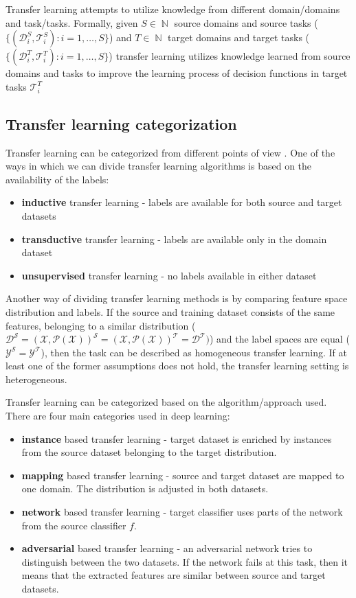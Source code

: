 \documentclass[a4paper,11pt,twoside]{report}
\theoremstyle{definition}
\DeclareMathOperator{\natur}{\mathbb{N}}
\begin{document}
Transfer learning attempts to utilize knowledge from different domain/domains and task/tasks. Formally, given $S \in \natur$ source domains and source tasks ($\{(\mathcal{D}_i^S,\mathcal{T}_i^S): i=1, \dots, S \}$) and $T \in \natur$ target domains and target tasks ($\{(\mathcal{D}_i^T,\mathcal{T}_i^T): i=1, \dots, S \}$) transfer learning utilizes knowledge learned from source domains and tasks to improve the learning process of decision functions in target tasks $\mathcal{T}_i^T$
\subsection{Transfer learning categorization}
Transfer learning can be categorized from different points of view \cite{comp_survey_transfer_leaerning}. One of the ways in which we can divide transfer learning algorithms is based on the availability of the labels:
\begin{itemize}
\item \textbf{inductive} transfer learning - labels are available for both source and target datasets
\item \textbf{transductive} transfer learning - labels are available only in the domain dataset
\item \textbf{unsupervised} transfer learning - no labels available in either dataset
\end{itemize}
Another way of dividing transfer learning methods is by comparing feature space distribution and labels. If the source and training dataset consists of the same features, belonging to a similar distribution ($\mathcal{D^S} = \mathcal{(X, P(X))^S} = \mathcal{(X, P(X))^T} = \mathcal{D^T})$) and the label spaces are equal ($\mathcal{Y^S} = \mathcal{Y^T} $), then the task can be described as homogeneous transfer learning. If at least one of the former assumptions does not hold, the transfer learning setting is heterogeneous.

Transfer learning can be categorized based on the algorithm/approach used. There are four main categories \cite{deep_tranfer_learning} used in deep learning:
\begin{itemize}
	\item \textbf{instance} based transfer learning - target dataset is enriched by instances from the source dataset belonging to the target distribution.
	\item \textbf{mapping} based transfer learning - source and target dataset are mapped to one domain. The distribution is adjusted in both datasets.
	\item \textbf{network} based transfer learning - target classifier uses parts of the network from the source classifier $f$.
	\item \textbf{adversarial} based transfer learning - an adversarial network tries to distinguish between the two datasets. If the network fails at this task, then it means that the extracted features are similar between source and target datasets.
\end{itemize}
\end{document}
